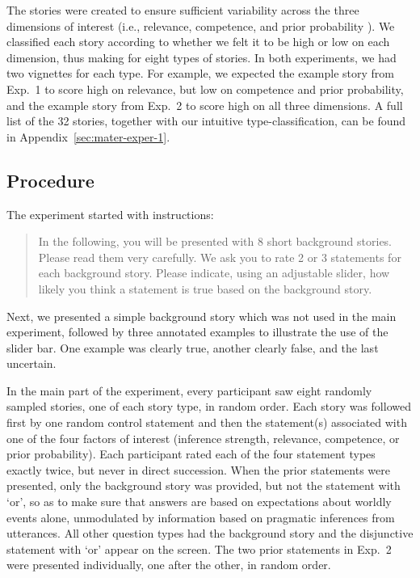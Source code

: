 \documentclass[12pt]{article}
\begin{document}
The stories were created to ensure sufficient variability across the three dimensions of
interest (i.e., relevance, competence, and prior probability ). We classified each story according to whether we felt it to be high or low on each dimension, thus making for eight types of stories. In both experiments, we had two vignettes for each type. For example, we expected the example story from Exp.\ 1 to score high on relevance, but low on competence and prior probability, and the example story from Exp.\ 2 to score high on all three dimensions. A full list of the 32 stories, together with our intuitive type-classification, can be found in Appendix~\ref{sec:mater-exper-1}. 

\subsection*{Procedure}

The experiment started with instructions:

\begin{quote}
  In the following, you will be presented with 8 short background stories. Please read them
  very carefully. We ask you to rate 2 or 3 statements for each background story. Please
  indicate, using an adjustable slider, how likely you think a statement is true based on the
  background story.
\end{quote}

\noindent Next, we presented a simple background story which was not used in the main
experiment, followed by three annotated examples to illustrate the use of the slider bar. One example was clearly true, another clearly false, and the last uncertain.

In the main part of the experiment, every participant saw eight randomly sampled stories, one of each story type, in random order. Each story was followed first by one random control
statement and then the statement(s) associated with one of the four factors of interest
(inference strength, relevance, competence, or prior probability). Each participant rated each of the four statement types exactly twice, but never in direct succession. When the prior statements were presented, only
the background story was provided, but not the statement with `or', so as to make sure that
answers are based on expectations about worldly events alone, unmodulated by information based
on pragmatic inferences from utterances. All other question types had the background story and
the disjunctive statement with `or' appear on the screen. The two prior statements in Exp.\ 2 were presented
individually, one after the other, in random order.
\end{document}
